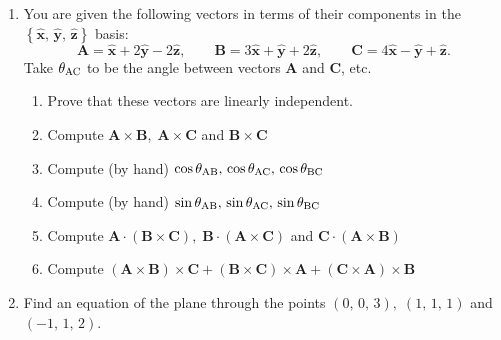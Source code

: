 \documentclass[fleqn]{article}
\begin{document}
\begin{enumerate}

  \item You are given the following vectors in terms of their components in
  the $\left\{ \mathbf{\hat{x}},\,\mathbf{\hat{y}},\mathbf{\, \hat{z}}\right\} $ basis: 
  \[
  \mathbf{A}=\mathbf{\hat{x}}+2\mathbf{\hat{y}-}2\mathbf{\hat{z}, \quad \quad B}=3\mathbf{\hat{x}}+\mathbf{\hat{y}+}2\mathbf{\hat{z}, \quad \quad C}=4\mathbf{\hat{x}}-\mathbf{\hat{y}+\hat{z}.}
  \]
  Take $\theta_{\rm AC}$ to be the angle between vectors $\mathbf{A}$ and $\mathbf{C}$, etc. 
  
  \begin{enumerate}
    \item Prove that these vectors are linearly independent. 
    
    
    
    
    \item Compute  $\mathbf{A\times B,\;A\times C}$ and $\mathbf{B\times C}$
    
    \item Compute (by hand) $\cos \theta_{\rm AB},\,\cos \theta_{\rm AC},\,\cos \theta_{\rm BC}$
    
    \item Compute (by hand) $\sin \theta_{\rm AB},\,\sin \theta_{\rm AC},\,\sin \theta_{\rm BC}$
    
    \item Compute $\mathbf{A\cdot }\left( \mathbf{B\times C}\right) ,\;\mathbf{B\cdot }\left( \mathbf{A\times C}\right) $ and $\mathbf{C\cdot }\left( \mathbf{A\times B}\right)$
    
    \item Compute $\left( \mathbf{A\times B}\right) \times \mathbf{C+}\left( \mathbf{B\times C}\right) \times \mathbf{A+}\left( \mathbf{C\times A}\right) \times \mathbf{B}$
  \end{enumerate}
  
  
  \item Find an equation of the plane through the points $\left(
  0,\,0,\,3\right) ,\;\left( 1,\,1,\,1\right) $ and $\left( -1,\,1,\,2\right) $.
  

\end{enumerate}
\end{document}
